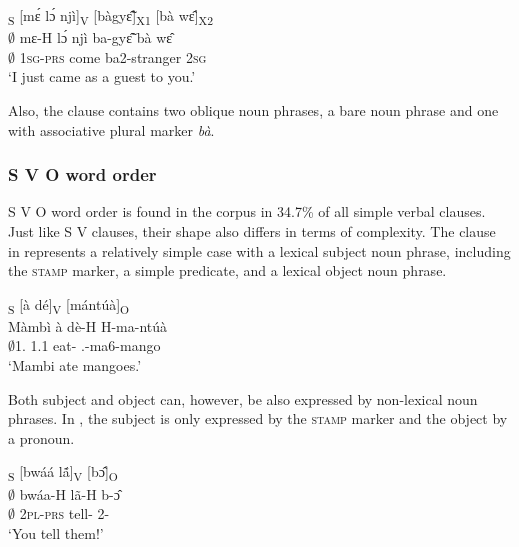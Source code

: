 \ea \label{SV4}
  \glll [$\emptyset$]\textsubscript{S} [mɛ́ lɔ́ njì]\textsubscript{V} [bàgyɛ̃̂]\textsubscript{X1} [bà wɛ̂]\textsubscript{X2} \\
     {\db}$\emptyset$  {\db}mɛ-H lɔ́ njì {\db}ba-gyɛ̃̂ {\db}bà wɛ̂ \\
     {\db}$\emptyset$  {\db}1\textsc{sg}-\textsc{prs} {\RETRO} come {\db}ba2-stranger {\db}{\AP} 2\textsc{sg}  \\
    \trans `I just came as a guest to you.'
\z

\noindent Also, the clause contains two oblique noun phrases, a bare noun phrase and one with associative plural marker {\itshape bà}.








\subsubsection{S V O word order}
\label{sec:SVO}


S V O word order is found in the corpus in 34.7\% of all simple verbal clauses. Just like S V clauses, their shape also differs in terms of complexity. The clause in  represents a relatively simple case with a lexical subject noun phrase, including the \textsc{stamp} marker, a simple predicate, and a lexical object noun phrase.


\ea\label{SVO1}
  \glll  [Màmbì]\textsubscript{S} [à dé]\textsubscript{V} [mántúà]\textsubscript{O} \\
	{\db}Màmbì {\db}à dè-H {\db}H-ma-ntúà \\
         {\db}$\emptyset$1.{\PN} {\db}1.{\PST}1 eat-{\PST} {\db}{\OBJ}.{\LINK}-ma6-mango\\
    \trans `Mambi ate mangoes.'
\z

Both subject and object can, however, be also expressed by non-lexical noun phrases. In , the subject is only expressed by the \textsc{stamp} marker and the object by a pronoun.

\ea \label{SVO2}
  \glll  [$\emptyset$]\textsubscript{S} [bwáá lã́]\textsubscript{V} [bɔ̂]\textsubscript{O}  \\
         {\db}$\emptyset$ {\db}bwáa-H lã-H {\db}b-ɔ̂ \\
         {\db}$\emptyset$  {\db}2\textsc{pl}-\textsc{prs} tell-{\R} {\db}2-{\OBJ}     \\
    \trans `You tell them!'
\z

